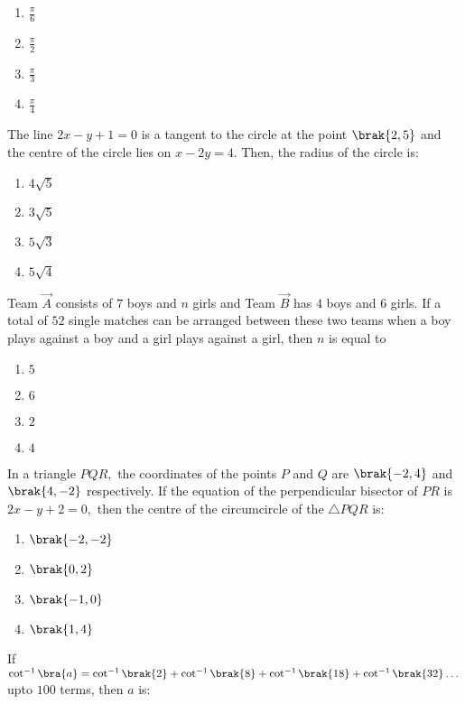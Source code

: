    \begin{enumerate}
        \item $\frac{\pi}{6}$
        \item $\frac{\pi}{2}$
        \item $\frac{\pi}{3}$
        \item $\frac{\pi}{4}$\\
    \end{enumerate}
    \item The line $2x-y+1=0$ is a tangent to the circle at the point $\brak{2, 5}$ and the centre of the circle lies on $x-2y=4.$ Then, the radius of the circle is:
    \begin{enumerate}
        \item $4\sqrt{5}$
        \item $3\sqrt{5}$
        \item $5\sqrt{3}$
        \item $5\sqrt{4}$\\
    \end{enumerate}
    \item Team $\Vec{A}$ consists of $7$ boys and $n$ girls and Team $\Vec{B}$ has $4$ boys and $6$ girls. If a total of $52$ single matches can be arranged between these two teams when a boy plays against a boy and a girl plays against a girl, then $n$ is equal to
    \begin{enumerate}
        \item $5$
        \item $6$
        \item $2$
        \item $4$\\
    \end{enumerate}
    \item In a triangle $PQR,$ the coordinates of the points $P$ and $Q$ are $\brak{-2, 4}$ and $\brak{4, -2}$ respectively. If the equation of the perpendicular bisector of $PR$ is $2x-y+2=0,$ then the centre of the circumcircle of the $\triangle PQR$ is:
    \begin{enumerate}
        \item $\brak{-2,-2}$
        \item $\brak{0,2}$
        \item $\brak{-1,0}$
        \item $\brak{1,4}$\\
    \end{enumerate}
    \item If $\cot^{-1}\bra{a}=\cot^{-1}\brak{2}+\cot^{-1}\brak{8}+\cot^{-1}\brak{18}+\cot^{-1}\brak{32}\dots$ upto $100$ terms, then $a$ is:
